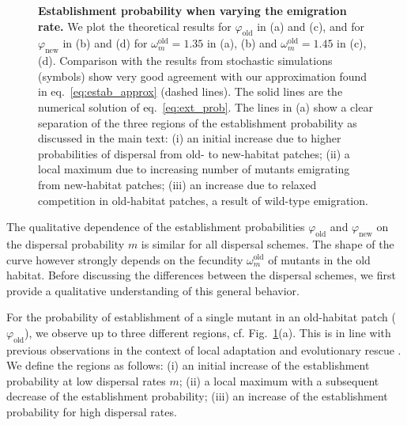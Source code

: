 \documentclass[11pt]{article}
\begin{document}
\begin{figure}[t!]
	\caption{\textbf{Establishment probability when varying the emigration rate.} \small We plot the theoretical results for $\varphi_{\text{old}}$ in (a) and (c), and for $\varphi_{\text{new}}$ in (b) and (d) for $\omega^\text{old}_m=1.35$ in (a), (b) and $\omega^\text{old}_m=1.45$ in (c), (d). Comparison with the results from stochastic simulations (symbols) show very good agreement with our approximation found in eq.~\eqref{eq:estab_approx} (dashed lines). The solid lines are the numerical solution of eq.~\eqref{eq:ext_prob}. The lines in (a) show a clear separation of the three regions of the establishment probability as discussed in the main text: {\color{change}(i) an initial increase due to higher probabilities of dispersal from old- to new-habitat patches; (ii) a local maximum due to increasing number of mutants emigrating from new-habitat patches; (iii) an increase due to relaxed competition in old-habitat patches, a result of wild-type emigration.}}
	\label{fig:vary_m_est}
\end{figure}

The qualitative dependence of the establishment probabilities $\varphi_{\text{old}}$ and $\varphi_{\text{new}}$ on the dispersal probability $m$ is similar for all dispersal schemes. The shape of the curve however strongly depends on the fecundity $\omega^\text{old}_m$ of mutants in the old habitat. Before discussing the differences between the dispersal schemes, we first provide a qualitative understanding of this general behavior.

For the probability of establishment of a single mutant in an old-habitat patch ($\varphi_{\text{old}}$), we observe up to three different regions, cf. Fig.~\ref{fig:vary_m_est}(a). This is in line with previous observations in the context of local adaptation \citep[e.g.][]{kawecki_1995,tomasini_2018} and evolutionary rescue \citep{uecker_2014}. We define the regions as follows: (i) an initial increase of the establishment probability at low dispersal rates $m$; (ii) a local maximum with a subsequent decrease of the establishment probability; (iii) an increase of the establishment probability for high dispersal rates.
\end{document}

